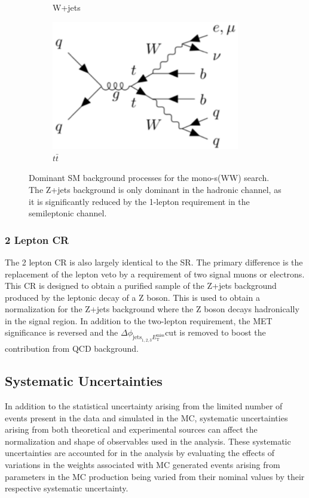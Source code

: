 \documentclass[12pt]{article}
\newcommand*{\met}{\ensuremath{E_\text{T}^\text{miss}}}
\newcommand*{\mindphi}{\ensuremath{\Delta \phi_{\text{jets}_{1,2,3} \met}}}
\begin{document}
\begin{figure}[H]
\begin{subfigure}[b]{0.4\textwidth}
         \caption[]{W+jets}
         \label{fig:wjets}
     \end{subfigure}
     \hfill
     \begin{subfigure}[b]{0.4\textwidth}
         \centering
         \includegraphics[width=0.9\textwidth]{figures/ttbar_feynman.png}
         \caption[]{$t\bar{t}$}
         \label{fig:ttbar}
     \end{subfigure}
\caption[]{Dominant SM background processes for the mono-s(WW) search. The Z+jets background is only dominant in the hadronic channel, as it is significantly reduced by the 1-lepton requirement in the semileptonic channel.}
\label{fig:dom_bkgs}
\end{figure}
\subsubsection{2 Lepton CR}

The 2 lepton CR is also largely identical to the SR. The primary difference is the replacement of the lepton veto by a requirement of two signal muons or electrons. This CR is designed to obtain a purified sample of the Z+jets background produced by the leptonic decay of a Z boson. This is used to obtain a normalization for the Z+jets background where the Z boson decays hadronically in the signal region. In addition to the two-lepton requirement, the MET significance is reversed and the \mindphi cut is removed to boost the contribution from QCD background. 

\subsection{Systematic Uncertainties}

In addition to the statistical uncertainty arising from the limited number of events present in the data and simulated in the MC, systematic uncertainties arising from both theoretical and experimental sources can affect the normalization and shape of observables used in the analysis. These systematic uncertainties are accounted for in the analysis by evaluating the effects of variations in the weights associated with MC generated events arising from parameters in the MC production being varied from their nominal values by their respective systematic uncertainty. 
\end{document}
